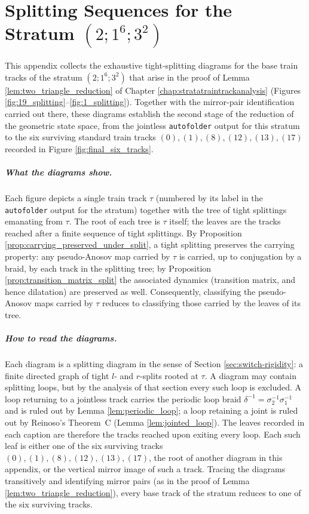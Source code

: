 \chapter[Splitting Sequences for the Stratum $(2;1^6;3^2)$]{Splitting Sequences for the Stratum $(2;1^6;3^2)$}
\label{app:splitting_big_stratum}

This appendix collects the exhaustive tight-splitting diagrams for the base train tracks of the stratum $(2; 1^6; 3^2)$ that arise in the proof of Lemma \ref{lem:two_triangle_reduction} of Chapter \ref{chap:stratatraintrackanalysis} (Figures \ref{fig:19_splitting}--\ref{fig:1_splitting}). Together with the mirror-pair identification carried out there, these diagrams establish the second stage of the reduction of the geometric state space, from the jointless \texttt{autofolder} output for this stratum to the six surviving standard train tracks $(0), (1), (8), (12), (13), (17)$ recorded in Figure \ref{fig:final_six_tracks}.

\paragraph{What the diagrams show.} Each figure depicts a single train track $\tau$ (numbered by its label in the \texttt{autofolder} output for the stratum) together with the tree of tight splittings emanating from $\tau$. The root of each tree is $\tau$ itself; the leaves are the tracks reached after a finite sequence of tight splittings. By Proposition \ref{prop:carrying_preserved_under_split}, a tight splitting preserves the carrying property: any pseudo-Anosov map carried by $\tau$ is carried, up to conjugation by a braid, by each track in the splitting tree; by Proposition \ref{prop:transition_matrix_split} the associated dynamics (transition matrix, and hence dilatation) are preserved as well. Consequently, classifying the pseudo-Anosov maps carried by $\tau$ reduces to classifying those carried by the leaves of its tree.

\paragraph{How to read the diagrams.} Each diagram is a splitting diagram in the sense of Section \ref{sec:switch-rigidity}: a finite directed graph of tight $l$- and $r$-splits rooted at $\tau$. A diagram may contain splitting loops, but by the analysis of that section every such loop is excluded. A loop returning to a jointless track carries the periodic loop braid $\delta^{-1} = \sigma_2^{-1}\sigma_1^{-1}$ and is ruled out by Lemma \ref{lem:periodic_loop}; a loop retaining a joint is ruled out by Reinoso's Theorem~C (Lemma \ref{lem:jointed_loop}). The leaves recorded in each caption are therefore the tracks reached upon exiting every loop. Each such leaf is either one of the six surviving tracks $(0), (1), (8), (12), (13), (17)$, the root of another diagram in this appendix, or the vertical mirror image of such a track. Tracing the diagrams transitively and identifying mirror pairs (as in the proof of Lemma \ref{lem:two_triangle_reduction}), every base track of the stratum reduces to one of the six surviving tracks.

